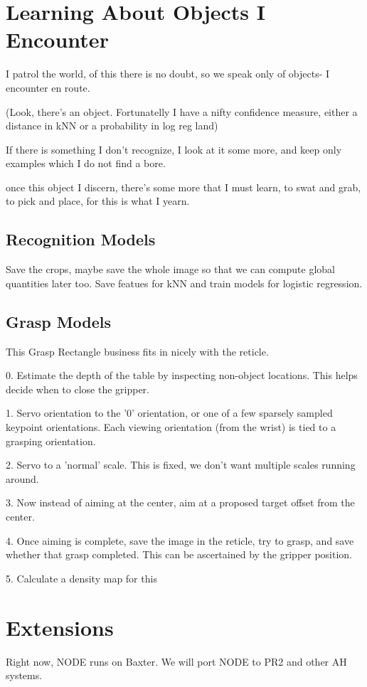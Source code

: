 \documentclass[conference]{IEEEtran}
\begin{document}
\section{Learning About Objects I Encounter}
I patrol the world, 
of this there is no doubt,
so we speak only of objects-
I encounter en route.

(Look, there's an object.
Fortunatelly I have a nifty confidence measure, either a distance in kNN or a probability in
log reg land)

If there is something I don't recognize, 
I look at it some more,
and keep only examples which I do not find a bore.

once this object I discern,
there's some more that I must learn,
to swat and grab, to pick and place,
for this is what I yearn.

\subsection{Recognition Models}
Save the crops, maybe save the whole image so that we can compute global quantities later too.
Save featues for kNN and train models for logistic regression.


\subsection{Grasp Models}
This Grasp Rectangle business fits in nicely with the reticle.

0. Estimate the depth of the table by inspecting non-object locations. This helps decide when to close the gripper.

1. Servo orientation to the '0' orientation, or one of a few sparsely sampled keypoint orientations.
Each viewing orientation (from the wrist) is tied to a grasping orientation.

2. Servo to a 'normal' scale. This is fixed, we don't want multiple scales running around.

3. Now instead of aiming at the center, aim at a proposed target offset from the center.

4. Once aiming is complete, save the image in the reticle, try to grasp, and save whether that grasp completed.
This can be ascertained by the gripper position.

5. Calculate a density map for this 


\citep{tellex11}


\section{Extensions}
Right now, NODE runs on Baxter. We will port NODE to PR2 and other AH systems.





\end{document}
